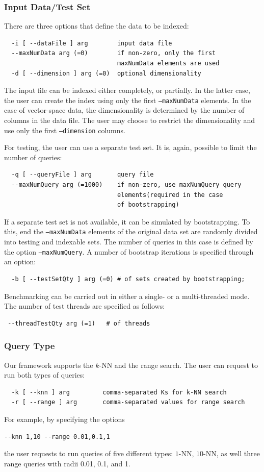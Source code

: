 \documentclass[runningheads,a4paper]{llncs}
\newcommand{\ttt}[1]{\texttt{#1}}
\newcommand{\knn}{$k$-NN }
\begin{document}
{\subsubsection{Input Data/Test Set}
There are three options that define the data to be indexed:
\begin{verbatim}
  -i [ --dataFile ] arg        input data file
  --maxNumData arg (=0)        if non-zero, only the first 
                               maxNumData elements are used
  -d [ --dimension ] arg (=0)  optional dimensionality
\end{verbatim}
The input file can be indexed either completely, or partially.
In the latter case, the user can create the index using only
the first \ttt{--maxNumData} elements.
In the case of vector-space data, the dimensionality is determined
by the number of columns in the data file.
The user may choose to restrict the dimensionality and use only the first 
\ttt{--dimension} columns.

For testing, the user can use a separate test set.
It is, again, possible to limit the number of queries:
\begin{verbatim}
  -q [ --queryFile ] arg       query file
  --maxNumQuery arg (=1000)    if non-zero, use maxNumQuery query 
                               elements(required in the case 
                               of bootstrapping)
\end{verbatim}
If a separate test set is not available, it can be simulated by bootstrapping.
To this, end the \ttt{--maxNumData} elements of the original data set
are randomly divided into testing and indexable sets.
The number of queries in this case is defined by the option \ttt{--maxNumQuery}.
A number of bootstrap iterations is specified through an option:
\begin{verbatim}
  -b [ --testSetQty ] arg (=0) # of sets created by bootstrapping; 
\end{verbatim}
Benchmarking can be carried out in either a single- or a multi-threaded
mode. The number of test threads are specified as follows:
\begin{verbatim}
 --threadTestQty arg (=1)   # of threads
\end{verbatim}

\subsubsection{Query Type} 
Our framework supports the \knn and the range search.
The user can request to run both types of queries:
\begin{verbatim}
  -k [ --knn ] arg         comma-separated Ks for k-NN search
  -r [ --range ] arg       comma-separated values for range search
\end{verbatim}
For example, by specifying the options 
\begin{verbatim}
--knn 1,10 --range 0.01,0.1,1
\end{verbatim}
the user requests to run queries of five different types: $1$-NN, $10$-NN,
as well three range queries with radii 0.01, 0.1, and 1.

}
\end{document}
